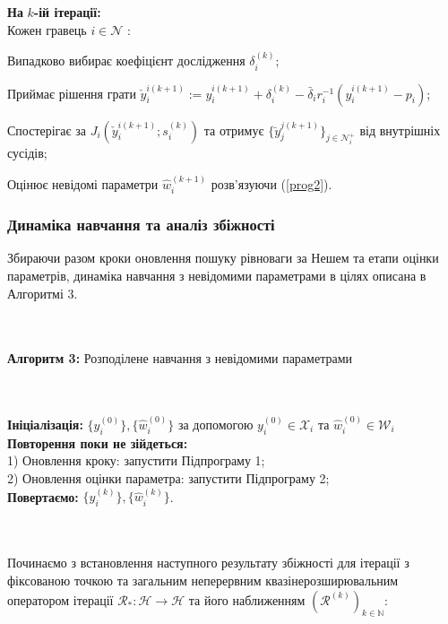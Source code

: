 \documentclass[a4paper]{article}
\begin{document}
\hline\\\

\noindent\textbf{На} $k$\textbf{-ій ітерації:}\\
Кожен гравець $i \in \mathcal{N}$ :

Випадково вибирає коефіцієнт дослідження $\delta_{i}^{(k)}$;

Приймає рішення грати $\check{y}_{i}^{i(k+1)}:=y_{i}^{i(k+1)}+\delta_{i}^{(k)}-\bar{\delta}_{i} r_{i}^{-1}(y_{i}^{i(k+1)}-p_{i})$;

Спостерігає за $J_{i}(\check{y}_{i}^{i(k+1)} ; s_{i}^{(k)})$ та отримує $\{\breve{y}_{j}^{j(k+1)}\}_{j \in \mathcal{N}_{i}^{+}}$ від внутрішніх сусідів;

Оцінює невідомі параметри $\hat{w}_{i}^{(k+1)}$ розв'язуючи (\ref{prog2}).\\

\hline

\clearpage
\subsubsection{Динаміка навчання та аналіз збіжності}
Збираючи разом кроки оновлення пошуку рівноваги за Нешем та етапи оцінки параметрів, динаміка навчання з невідомими параметрами в цілях описана в Алгоритмі 3.\\

\hline\\\

\textbf{Алгоритм 3:} Розподілене навчання з невідомими параметрами\\

\hline\\\

\noindent\textbf{Ініціалізація:} $\{y_{i}^{(0)}\},\{\hat{w}_{i}^{(0)}\}$ за допомогою $y_{ i}^{(0)} \in \mathcal{X}_{i}$ та $\hat{w}_{i}^{(0)} \in \mathcal{W}_{i}$\\
\textbf{Повторення поки не зійдеться:}\\
1) Оновлення кроку: запустити Підпрограму 1;\\
2) Оновлення оцінки параметра: запустити Підпрограму 2;\\
\textbf{Повертаємо:} $\{y_{i}^{(k)}\},\{\hat{w}_{i}^{(k)}\}$.\\

\hline\\\

Починаємо з встановлення наступного результату збіжності для ітерації з фіксованою точкою та загальним неперервним квазінерозширювальним оператором ітерації $\mathscr{R}_{*}: \mathcal{H } \rightarrow \mathcal{H}$ та його наближенням $\left(\mathscr{R}^{(k)}\right)_{k \in \mathbb{N}}$:
\end{document}
